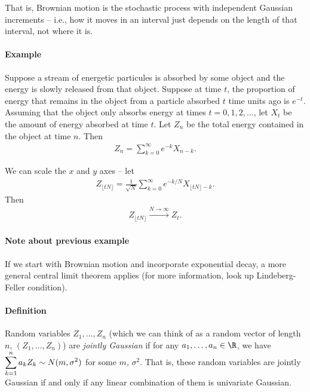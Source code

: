 That is, Brownian motion is the stochastic process with independent Gaussian increments 
-- i.e., how it moves in an interval just depends on the length of that interval, not where it is.

\paragraph{Example} Suppose a stream of energetic particules is absorbed by some object and the energy is slowly released from that object.  
Suppose at time $t$, the proportion of energy that remains in the object from a particle absorbed $t$ time units ago is $e^{-t}$.  
Assuming that the object only absorbs energy at times $t=0,1,2,\dots$, let $X_t$ be the amount of energy absorbed at time $t$.  
Let $Z_n$ be the total energy contained in the object at time $n$.  
Then 
$$\begin{aligned}
    Z_n=\sum_{k=0}^\infty e^{-k}X_{n-k}.
\end{aligned}$$


We can scale the $x$ and $y$ axes -- let 
$$\begin{aligned}
    Z_{\lfloor tN\rfloor}=\frac{1}{\sqrt{N}}\sum_{k=0}^\infty e^{-k/N}X_{\lfloor tN\rfloor-k}.
\end{aligned}$$
Then 
$$\begin{aligned}
    Z_{\lfloor tN\rfloor}\xrightarrow{N\to\infty}Z_t.
\end{aligned}$$



\paragraph{Note about previous example} 
If we start with Brownian motion and incorporate exponential decay, 
a more general central limit theorem applies (for more information, look up Lindeberg-Feller condition).

\paragraph{Definition} 
Random variables $Z_1,\dots,Z_n$ (which we can think of as a random vector of length $n$, $(Z_1,\dots,Z_n)$) are \emph{jointly Gaussian} 
if for any $a_1,\dots,a_n\in\R$, we have $\displaystyle\sum_{k=1}^n a_kZ_k\sim N(m,\sigma^2)$ for some $m$, $\sigma^2$.  
That is, these random variables are jointly Gaussian if and only if any linear combination of them is univariate Gaussian.

